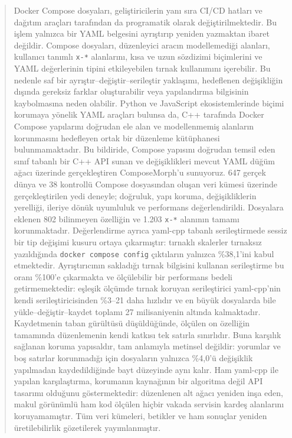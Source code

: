 \documentclass[conference]{IEEEtran}
\begin{document}
\begin{abstract}
Docker Compose dosyaları, geliştiricilerin yanı sıra CI/CD hatları ve
dağıtım araçları tarafından da programatik olarak değiştirilmektedir. Bu
işlem yalnızca bir YAML belgesini ayrıştırıp yeniden yazmaktan ibaret
değildir. Compose dosyaları, düzenleyici aracın modellemediği alanları,
kullanıcı tanımlı \texttt{x-*} alanlarını, kısa ve uzun sözdizimi
biçimlerini ve YAML değerlerinin tipini etkileyebilen tırnak kullanımını
içerebilir. Bu nedenle saf bir ayrıştır--değiştir--serileştir yaklaşımı,
hedeflenen değişikliğin dışında gereksiz farklar oluşturabilir veya
yapılandırma bilgisinin kaybolmasına neden olabilir. Python ve JavaScript
ekosistemlerinde biçimi korumaya yönelik YAML araçları bulunsa da, C++
tarafında Docker Compose yapılarını doğrudan ele alan ve modellenmemiş
alanların korunmasını hedefleyen ortak bir düzenleme kütüphanesi
bulunmamaktadır. Bu bildiride, Compose yapısını doğrudan temsil eden sınıf
tabanlı bir C++ API sunan ve değişiklikleri mevcut YAML düğüm ağacı üzerinde
gerçekleştiren ComposeMorph'u sunuyoruz. 647 gerçek dünya ve 38 kontrollü 
Compose dosyasından oluşan veri kümesi üzerinde gerçekleştirilen yedi 
deneyle; doğruluk, yapı koruma, değişikliklerin yerelliği, ileriye dönük 
uyumluluk ve performans değerlendirildi. Dosyalara eklenen 802 bilinmeyen
özelliğin ve 1.203 \texttt{x-*} alanının tamamı korunmaktadır.
Değerlendirme ayrıca
yaml-cpp tabanlı serileştirmede sessiz bir tip değişimi kusuru ortaya
çıkarmıştır: tırnaklı skalerler tırnaksız yazıldığında
\texttt{docker compose config} çıktıların yalnızca \%38,1'ini kabul
etmektedir. Ayrıştırıcının sakladığı tırnak bilgisini kullanan
serileştirme bu oranı \%100'e çıkarmakta ve ölçülebilir bir performans
bedeli getirmemektedir: eşleşik ölçümde tırnak koruyan serileştirici
yaml-cpp'nin kendi serileştiricisinden \%3--21 daha hızlıdır ve en büyük
dosyalarda bile yükle--değiştir--kaydet toplamı 27 milisaniyenin altında
kalmaktadır. Kaydetmenin taban gürültüsü düşüldüğünde, ölçülen on
özelliğin tamamında düzenlemenin kendi katkısı tek satırla sınırlıdır.
Buna karşılık sağlanan koruma yapısaldır, tam anlamıyla metinsel
değildir: yorumlar ve boş satırlar korunmadığı için dosyaların yalnızca
\%4,0'ü değişiklik yapılmadan kaydedildiğinde bayt düzeyinde aynı kalır.
Ham yaml-cpp ile yapılan karşılaştırma, korumanın kaynağının bir algoritma
değil API tasarımı olduğunu göstermektedir: düzenlenen alt ağacı yeniden
inşa eden, makul görünümlü ham kod ölçülen hiçbir vakada servisin kardeş
alanlarını koruyamamıştır. Tüm veri kümeleri, betikler ve ham sonuçlar 
yeniden üretilebilirlik gözetilerek yayımlanmıştır.
\end{abstract}
\end{document}
